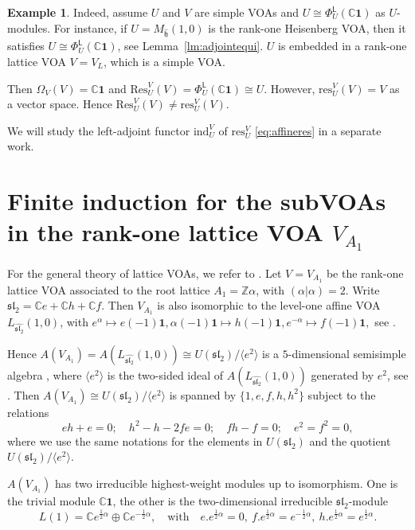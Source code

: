 \documentclass[12pt,a4paper,reqno]{amsart}
\numberwithin{equation}{section}
\numberwithin{equation}{section}
\theoremstyle{definition}
\newtheorem{example}[thm]{Example}
\newcommand{\Z}{\mathbb{Z}}
\def \C {\mathbb{C}}
\def \al{\alpha}
\def \op {\oplus}
\def \vac {\mathbf{1}}
\def \h {\mathfrak{h}}
\def\Res{\mathrm{Res}}
\def\L{\mathcal{L}}
\def\Om{\Omega}
\def\<{\langle}
\def\>{\rangle}
\def\L{\mathsf{L}}
\def\L{\mathsf{L}}
\def\sl{\mathfrak{sl}}
\begin{document}
	\begin{example}
		Indeed, assume $U$ and $V$ are simple VOAs and $U\cong \Phi^\L_{U}(\C\vac)$ as $U$-modules. For instance, if $U=M_{\hat{\h}}(1,0)$ is the rank-one Heisenberg VOA, then it satisfies $U\cong \Phi^\L_{U}(\C\vac)$, see Lemma~\ref{lm:adjointequi}. $U$ is embedded in a rank-one lattice VOA $V=V_{L}$, which is a simple VOA. 
		
		Then $\Om_V(V)=\C\vac$ and $\Res^V_U(V)=\Phi^\L_U(\C\vac)\cong U$. However, $\mathrm{res}^V_U(V)=V$ as a vector space. Hence $\Res^V_U(V)\neq \mathrm{res}^V_U(V)$. 
	\end{example}	
	
	We will study the left-adjoint functor $\mathrm{ind}^V_U$ of $\mathrm{res}^V_U$ \eqref{eq:affineres} in a separate work. 
	
	
	
	\section{Finite induction for the subVOAs in the rank-one lattice VOA $V_{A_1}$}\label{sec:3}
	For the general theory of lattice VOAs, we refer to \cite{FLM}. 
	Let $V=V_{A_1}$ be the rank-one lattice VOA associated to the root lattice $A_1=\Z\al$, with $(\al|\al)=2$. Write $\sl_2=\C e+\C h+\C f$. Then $V_{A_1}$ is also isomorphic to the level-one affine VOA $L_{\widehat{\sl_2}}(1,0)$, with $e^\al\mapsto e(-1)\vac,\al(-1)\vac\mapsto h(-1)\vac, e^{-\al}\mapsto f(-1)\vac,$ see \cite{FK80,FZ92}. 
	
	Hence $A(V_{A_1})=A(L_{\widehat{\sl_2}}(1,0))\cong U(\sl_2)/\<e^2\>$ is a $5$-dimensional semisimple algebra \cite{DLM1,DLM97}, where $\<e^2\>$ is the two-sided ideal of $A(L_{\widehat{\sl_2}}(1,0))$ generated by $e^2$, see \cite{FZ92}. 
	Then $A(V_{A_1})\cong U(\sl_2)/\<e^2\>$ is spanned by $\{1,e,f,h,h^2\}$ subject to the relations
	\begin{equation}\label{3.26}
		eh+e=0;\quad h^2-h-2fe=0;\quad fh-f=0;\quad e^2=f^2=0,
	\end{equation}
	where we use the same notations for the elements in $U(\sl_2)$ and the quotient $U(\sl_2)/\<e^2\>$. 
	
	$A(V_{A_1})$ has two irreducible highest-weight modules up to isomorphism. One is the trivial module $\C\vac$, the other is the two-dimensional irreducible $\sl_2$-module
	$$ L(1)=\C e^{\frac{1}{2}\al}\op \C e^{-\frac{1}{2}\al},\quad \mathrm{with}\quad e.e^{\frac{1}{2}\al}=0,\ f.e^{\frac{1}{2}\al}=e^{-\frac{1}{2}\al},\ h.e^{\frac{1}{2}\al}=e^{\frac{1}{2}\al}.$$
	
\end{document}

